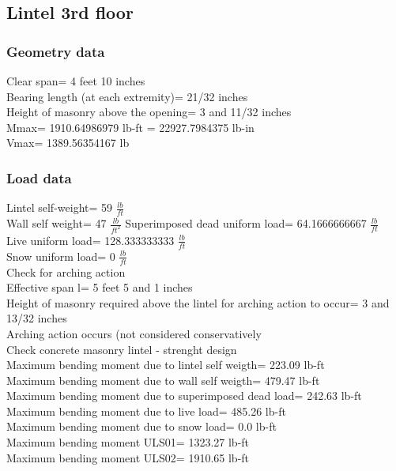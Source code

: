 \subsection{Lintel 3rd floor}
\subsubsection{Geometry data}
Clear span=  4 feet 10 inches \\
Bearing length (at each extremity)=  21/32 inches \\
Height of masonry above the opening=  3 and 11/32 inches \\
Mmax=  1910.64986979 lb-ft = 22927.7984375  lb-in \\
Vmax=  1389.56354167 lb \\
\subsubsection{Load data}
Lintel self-weight=  59  $\frac{lb}{ft}$ \\
Wall self weight=  47 $\frac{lb}{ft^2}$
Superimposed dead uniform load=  64.1666666667 $\frac{lb}{ft}$ \\
Live uniform load=  128.333333333 $\frac{lb}{ft}$ \\
Snow uniform load=  0 $\frac{lb}{ft}$ \\
\vspace{0.25 cm}
Check for arching action \\
Effective span l=  5 feet 5 and 1 inches \\
Height of masonry required above the lintel for arching action to occur=  3 and 13/32 inches \\
Arching action occurs (not considered conservatively \\
Check concrete masonry lintel - strenght design \\
Maximum bending moment due to lintel self weigth=  223.09 lb-ft \\
Maximum bending moment due to wall self weigth=  479.47 lb-ft \\
Maximum bending moment due to superimposed dead load=  242.63 lb-ft \\
Maximum bending moment due to live load=  485.26 lb-ft \\
Maximum bending moment due to snow load=  0.0 lb-ft \\
Maximum bending moment ULS01=  1323.27 lb-ft \\
Maximum bending moment ULS02=  1910.65 lb-ft \\

